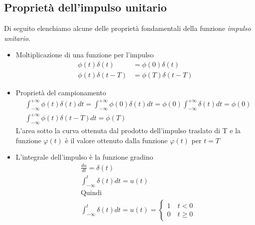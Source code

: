 \documentclass[a4paper, titlepage, oneside]{scrbook}
\begin{document}
\subsection{Proprietà dell'impulso unitario}
Di seguito elenchiamo alcune delle proprietà fondamentali della funzione \textit{impulso unitario}.
\begin{itemize}
	\item Moltiplicazione di una funzione per l'impulso
	\begin{align*}
	\phi(t)\delta(t)&=\phi(0)\delta(t)\\
	\phi(t)\delta(t-T)&=\phi(T)\delta(t-T)
	\end{align*}
	
	\item Proprietà del campionamento
	\begin{align*}
	&\int_{-\infty}^{+\infty} \phi(t)\delta(t)dt=\int_{-\infty}^{+\infty} \phi(0)\delta(t)dt=\phi(0)\int_{-\infty}^{+\infty} \delta(t)dt=\phi(0)\\
	&\int_{-\infty}^{+\infty} \phi(t)\delta(t-T)dt=\phi(T)
	\end{align*}
	L'area sotto la curva ottenuta dal prodotto dell'impulso traslato di T e la funzione $\varphi(t)$ è il valore ottenuto dalla funzione $\varphi(t)$ per $t=T$
	
	\item L'integrale dell'impulso è la funzione gradino
	\begin{align*}
		&\frac{du}{dt}=\delta(t)\\
		&\int_{-\infty}^{t}\delta(t)dt=u(t)\\
		&\text{Quindi}\\
		&\int_{-\infty}^{t}\delta(t)dt=u(t)=
		\left\{
		\begin{array}{ll}
		1 \quad t<0\\
		0 \quad t\geq0
		\end{array}
		\right.
	\end{align*}
\end{itemize}
\end{document}
